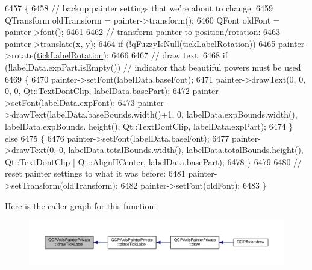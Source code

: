 \begin{DoxyCode}
6457 \{
6458   \textcolor{comment}{// backup painter settings that we're about to change:}
6459   QTransform oldTransform = painter->transform();
6460   QFont oldFont = painter->font();
6461   
6462   \textcolor{comment}{// transform painter to position/rotation:}
6463   painter->translate(\hyperlink{_comparision_pictures_2_createtest_image_8m_a9336ebf25087d91c818ee6e9ec29f8c1}{x}, \hyperlink{_comparision_pictures_2_createtest_image_8m_a2fb1c5cf58867b5bbc9a1b145a86f3a0}{y});
6464   \textcolor{keywordflow}{if} (!qFuzzyIsNull(\hyperlink{class_q_c_p_axis_painter_private_ae6ade9232a8e400924009e8edca94bac}{tickLabelRotation}))
6465     painter->rotate(\hyperlink{class_q_c_p_axis_painter_private_ae6ade9232a8e400924009e8edca94bac}{tickLabelRotation});
6466   
6467   \textcolor{comment}{// draw text:}
6468   \textcolor{keywordflow}{if} (!labelData.expPart.isEmpty()) \textcolor{comment}{// indicator that beautiful powers must be used}
6469   \{
6470     painter->setFont(labelData.baseFont);
6471     painter->drawText(0, 0, 0, 0, Qt::TextDontClip, labelData.basePart);
6472     painter->setFont(labelData.expFont);
6473     painter->drawText(labelData.baseBounds.width()+1, 0, labelData.expBounds.width(), labelData.expBounds.
      height(), Qt::TextDontClip,  labelData.expPart);
6474   \} \textcolor{keywordflow}{else}
6475   \{
6476     painter->setFont(labelData.baseFont);
6477     painter->drawText(0, 0, labelData.totalBounds.width(), labelData.totalBounds.height(), Qt::TextDontClip
       | Qt::AlignHCenter, labelData.basePart);
6478   \}
6479   
6480   \textcolor{comment}{// reset painter settings to what it was before:}
6481   painter->setTransform(oldTransform);
6482   painter->setFont(oldFont);
6483 \}
\end{DoxyCode}


Here is the caller graph for this function\+:\nopagebreak
\begin{figure}[H]
\begin{center}
\leavevmode
\includegraphics[width=350pt]{class_q_c_p_axis_painter_private_ad8f2f12cd35b8189e8bf96679e873933_icgraph}
\end{center}
\end{figure}


\hypertarget{class_q_c_p_axis_painter_private_a91a023bbefe1c3bf330570c0b985de84}{}
